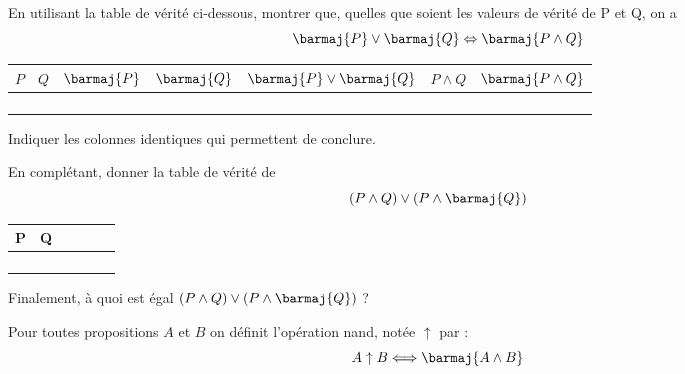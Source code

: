 \documentclass[a4paper,12pt]{article}
\begin{document}

\exo{}

En utilisant la table de vérité ci-dessous, montrer que, quelles que soient les valeurs de vérité de P et Q, on a $$\barmaj{P} \vee \barmaj{Q}\Leftrightarrow \barmaj{P\wedge Q}$$

\begin{center}
	\begin{tabular}{|c|c|c|c|c|c|c|}
		\hline
		$P$ & $Q$ & $\barmaj{P}$ & $\barmaj{Q}$ & $\barmaj{P} \vee \barmaj{Q}$  & $P\wedge Q$ & $\barmaj{P\wedge Q}$ \\
		\hline
		&  &  &  &  &  &\\
		\hline
&		&  &  &  &  &  \\
		\hline
&		&  &  &  &  &  \\
		\hline
&		&  &  &  &  &  \\
		\hline
	\end{tabular}
\end{center}
Indiquer les colonnes identiques qui permettent de conclure.\\[1.5em]

\exo{}

En complétant, donner la table de vérité de $$\left(P\wedge Q\right)\vee \left(P\wedge\barmaj{Q}\right)$$

\begin{center}

	\begin{tabular}{|c|c|c|c|c|c|}
		\hline
		P & Q & \hspace{1cm} &\hspace{1cm} & \hspace{1cm}  &\hspace{1cm} \\
		\hline
		&  &  &  &  &  \\
		\hline
		&  &  &  &  &  \\
		\hline
		&  &  &  &  &  \\
		\hline
		&  &  &  & 	&    \\
		\hline
	\end{tabular}
\end{center}
Finalement, à quoi est égal $\left(P\wedge Q\right)\vee \left(P\wedge\barmaj{Q}\right)$ ?\\


\newpage
{}

Pour toutes propositions $A$ et $B$ on définit l'opération \og nand\fg{}, notée $\uparrow$ par : $$A\uparrow B \Longleftrightarrow\barmaj{A\wedge B}$$
\end{document}
